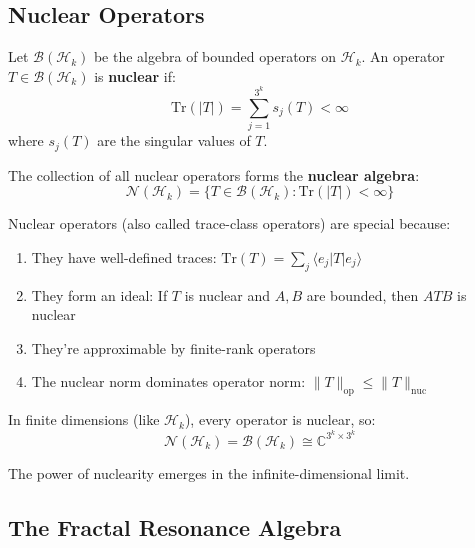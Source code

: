 \subsection{Nuclear Operators}

\begin{defn}\label{def:nuclear-operators}
Let $\mathcal{B}(\mathcal{H}_k)$ be the algebra of bounded operators on $\mathcal{H}_k$. An operator $T \in \mathcal{B}(\mathcal{H}_k)$ is \textbf{nuclear} if:
\begin{equation}
\text{Tr}(|T|) = \sum_{j=1}^{3^k} s_j(T) < \infty
\end{equation}
where $s_j(T)$ are the singular values of $T$.

The collection of all nuclear operators forms the \textbf{nuclear algebra}:
\begin{equation}
\mathcal{N}(\mathcal{H}_k) = \{T \in \mathcal{B}(\mathcal{H}_k) : \text{Tr}(|T|) < \infty\}
\end{equation}
\end{defn}

\begin{level2}
Nuclear operators (also called trace-class operators) are special because:
\begin{enumerate}
\item They have well-defined traces: $\text{Tr}(T) = \sum_{j} \langle e_j | T | e_j \rangle$
\item They form an ideal: If $T$ is nuclear and $A, B$ are bounded, then $ATB$ is nuclear
\item They're approximable by finite-rank operators
\item The nuclear norm dominates operator norm: $\|T\|_{\text{op}} \leq \|T\|_{\text{nuc}}$
\end{enumerate}

In finite dimensions (like $\mathcal{H}_k$), every operator is nuclear, so:
\begin{equation}
\mathcal{N}(\mathcal{H}_k) = \mathcal{B}(\mathcal{H}_k) \cong \mathbb{C}^{3^k \times 3^k}
\end{equation}

The power of nuclearity emerges in the infinite-dimensional limit.
\end{level2}

\subsection{The Fractal Resonance Algebra}

